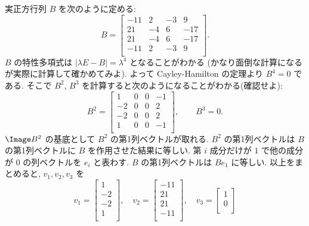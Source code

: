 \documentclass[12pt,twoside]{jarticle}
\begin{document}
\begin{example}
  実正方行列 $B$ を次のように定める:
  \begin{equation*}
    B =
    \begin{bmatrix}
      -11 &  2 & -3 &   9 \\
       21 & -4 &  6 & -17 \\
       21 & -4 &  6 & -17 \\
      -11 &  2 & -3 &   9 \\
    \end{bmatrix}.
  \end{equation*}
  $B$ の特性多項式は $|\lambda E - B|=\lambda^4$ となることがわかる
  (かなり面倒な計算になるが実際に計算して確かめてみよ).
  よって Cayley-Hamilton の定理より $B^4=0$ である.
  そこで $B^2$, $B^3$ を計算すると次のようになることがわかる(確認せよ):
  \begin{equation*}
    B^2 = 
    \begin{bmatrix}
       1 & 0 & 0 & -1 \\
      -2 & 0 & 0 &  2 \\
      -2 & 0 & 0 &  2 \\
       1 & 0 & 0 & -1 \\
    \end{bmatrix},
    \qquad
    B^3 = 0.
  \end{equation*}
  $\Image B^2$ の基底として $B^2$ の第1列ベクトルが取れる.
  $B^2$ の第1列ベクトルは $B$ の第1列ベクトルに $B$ を作用させた結果に等しい.
  第 $i$ 成分だけが $1$ で他の成分が $0$ の列ベクトルを $e_i$ と表わす.
  $B$ の第1列ベクトルは $Be_1$ に等しい.
  以上をまとめると, $v_1,v_2,v_3$ を
  \begin{equation*}
    v_1 = 
    \begin{bmatrix}
       1 \\
      -2 \\
      -2 \\
       1 \\
    \end{bmatrix},
    \quad
    v_2 =
    \begin{bmatrix}
      -11 \\
       21 \\
       21 \\
      -11 \\
    \end{bmatrix},
    \quad
    v_3 =
    \begin{bmatrix}
      1 \\
      0 \\

\end{bmatrix}
\end{equation*}
\end{example}
\end{document}
